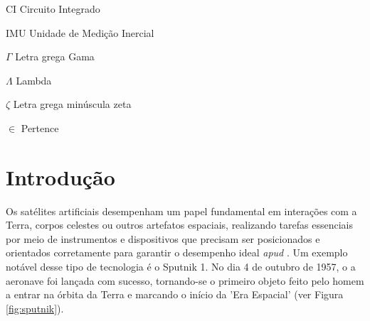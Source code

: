 \documentclass[
	12pt,				%
	openright,			%
	oneside,			%
	a4paper,			%
	english,			%
	brazil				%
	]{abntex2}
\begin{document}
\listoffigures*
\cleardoublepage

\listoftables*
\cleardoublepage


\begin{siglas}
  \item[CI] Circuito Integrado 
  \item[IMU] Unidade de Medição Inercial
\end{siglas}

\begin{simbolos}
  \item[$ \Gamma $] Letra grega Gama
  \item[$ \Lambda $] Lambda
  \item[$ \zeta $] Letra grega minúscula zeta
  \item[$ \in $] Pertence
\end{simbolos}

\tableofcontents*
\cleardoublepage


\makeatletter
{}
\makeatother




\textual


\chapter[Introdução]{Introdução}



Os satélites artificiais desempenham um papel fundamental em interações com a Terra, corpos celestes ou outros artefatos espaciais, realizando tarefas essenciais por meio de instrumentos e dispositivos que precisam ser posicionados e orientados corretamente para garantir o desempenho ideal \cite{shuster1993} \textit{apud} \cite{ferreira2008}. Um exemplo notável desse tipo de tecnologia é o Sputnik 1. No dia 4 de outubro de 1957, o a aeronave foi lançada com sucesso, tornando-se o primeiro objeto feito pelo homem a entrar na órbita da Terra e marcando o início da 'Era Espacial' (ver Figura \ref{fig:sputnik}). 
\end{document}
